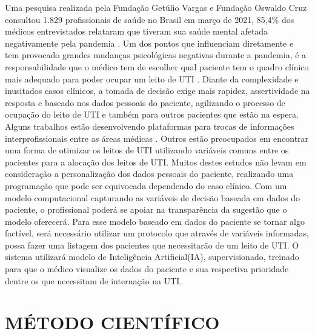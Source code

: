 \documentclass[12pt]{article}
\begin{document}
Uma pesquisa realizada pela Fundação Getúlio Vargas e Fundação Oswaldo Cruz consultou 1.829 profissionais de saúde no Brasil em março de 2021, 85,4\% dos médicos entrevistados relataram que tiveram sua saúde mental afetada negativamente pela pandemia \cite{paulomotoryn2021}. Um dos pontos que influenciam diretamente e tem provocado grandes mudanças psicológicas negativas durante a pandemia, é a responsabilidade que o médico tem de escolher qual paciente tem o quadro clínico mais adequado para poder ocupar um leito de UTI \cite{teixeira2020processo}.
Diante da complexidade e inusitados casos clínicos, a tomada de decisão exige mais rapidez, assertividade na resposta e baseado nos dados pessoais do paciente, agilizando o processo de ocupação do leito de UTI e também para outros pacientes que estão na espera. Alguns trabalhos estão desenvolvendo plataformas para trocas de informações interprofissionais entre as áreas médicas \cite{santos2020desenvolvimento}. Outros estão preocupados em encontrar uma forma de otimizar os leitos de UTI \cite{pinto2019alocaccao} utilizando variáveis comuns entre os pacientes para a alocação dos leitos de UTI. Muitos destes estudos não levam em consideração a personalização dos dados pessoais do paciente, realizando uma programação que pode ser equivocada dependendo do caso clínico.
Com um modelo computacional capturando as variáveis de decisão baseada em dados do paciente, o profissional poderá se apoiar na transparência da sugestão que o modelo oferecerá. Para esse modelo baseado em dados do paciente se tornar algo factível, será necessário utilizar um protocolo que através de variáveis informadas, possa fazer uma listagem dos pacientes que necessitarão de um leito de UTI. O sistema utilizará modelo de Inteligência Artificial(IA), supervisionado, treinado para que o médico visualize os dados do paciente e sua respectiva prioridade dentre os que necessitam de internação na UTI.


\section{MÉTODO CIENTÍFICO}
\end{document}
